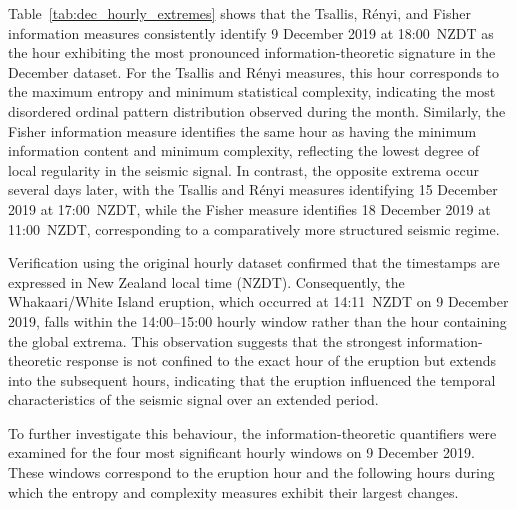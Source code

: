 \documentclass[12pt,a4paper]{article}
\begin{document}
Table~\ref{tab:dec_hourly_extremes} shows that the Tsallis, R\'enyi, and Fisher information measures consistently identify 9 December 2019 at 18:00~NZDT as the hour exhibiting the most pronounced information-theoretic signature in the December dataset. For the Tsallis and R\'enyi measures, this hour corresponds to the maximum entropy and minimum statistical complexity, indicating the most disordered ordinal  pattern distribution observed during the month. Similarly, the Fisher information measure identifies the same hour as having the minimum information content and minimum complexity, reflecting the lowest degree of local regularity in the seismic signal. In contrast, the opposite extrema occur several days later, with the Tsallis and R\'enyi measures identifying 15 December 2019 at 17:00~NZDT, while the Fisher measure identifies 18 December 2019 at 11:00~NZDT, corresponding to a comparatively more structured seismic regime.

Verification using the original hourly dataset confirmed that the timestamps are expressed in New Zealand local time (NZDT). Consequently, the Whakaari/White Island eruption, which occurred at 14:11~NZDT on 9 December 2019, falls within the 14:00--15:00 hourly window rather than the hour containing the global extrema. This observation suggests that the strongest information-theoretic response is not confined to the exact hour of the eruption but extends into the subsequent hours, indicating that the eruption influenced the temporal characteristics of the seismic signal over an extended period.

To further investigate this behaviour, the information-theoretic quantifiers were examined for the four most significant hourly windows on 9 December 2019. These windows correspond to the eruption hour and the following hours during which the entropy and complexity measures exhibit their largest changes.

\end{document}
